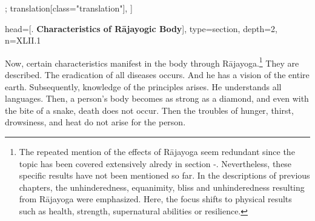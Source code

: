 \begin{alignment}[
  texts=edition[class="edition"];
  translation[class="translation"],
  ]
\begin{translation}
{  head={[. \textbf{Characteristics of Rājayogic Body}]},
  type=section,
  depth=2, 
  n=XLII.1 
}
\label{attributesrajabody}
    \begin{tlate}[p42_01]
    \bigskip
Now, certain characteristics manifest in the body through Rājayoga.\footnote{The repeated mention of the effects of Rājayoga seem redundant since the topic has been covered extensively alredy in section -. Nevertheless, these specific results have not been mentioned so far. In the descriptions of previous chapters, the unhinderedness, equanimity, bliss and unhinderedness resulting from Rājayoga were emphasized. Here, the focus shifts to physical results such as health, strength, supernatural abilities or resilience.} They are described. The eradication of all diseases occurs. And he has a vision of the entire earth. Subsequently, knowledge of the principles arises. 
He understands all languages. Then, a person's body becomes as strong as a diamond, and even with the bite of a snake, death does not occur. Then the troubles of hunger, thirst, drowsiness, and heat do not arise for the person.
\flushpage 
    \end{tlate}
  \end{translation}
\end{alignment}
\pagebreak %
